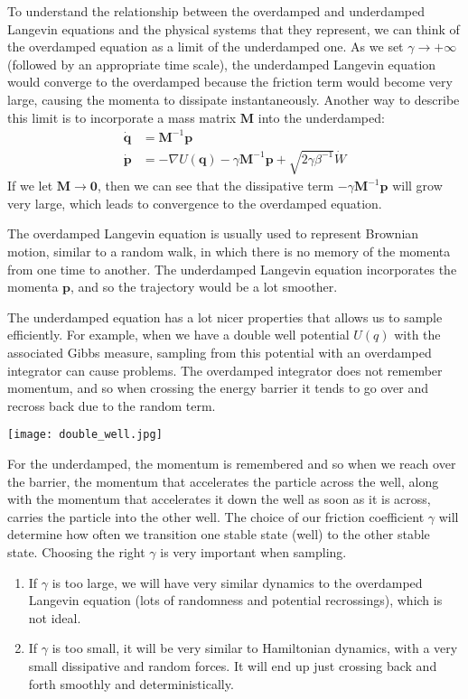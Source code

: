 \documentclass{article}
\theoremstyle{remark}
\theoremstyle{definition}
\begin{document}
To understand the relationship between the overdamped and underdamped Langevin equations and the physical systems that they represent, we can think of the overdamped equation as a limit of the underdamped one. As we set $\gamma \rightarrow +\infty$ (followed by an appropriate time scale), the underdamped Langevin equation would converge to the overdamped because the friction term would become very large, causing the momenta to dissipate instantaneously. Another way to describe this limit is to incorporate a mass matrix $\mathbf{M}$ into the underdamped: 
\begin{align*}
    \mathbf{\dot{q}} & = \mathbf{M}^{-1} \mathbf{p} \\
    \mathbf{\dot{p}} & = - \nabla U(\mathbf{q}) - \gamma \mathbf{M}^{-1} \mathbf{p} + \sqrt{2\gamma \beta^{-1}} \dot{W}
\end{align*}
If we let $\mathbf{M} \rightarrow \mathbf{0}$, then we can see that the dissipative term $- \gamma \mathbf{M}^{-1}  \mathbf{p}$ will grow very large, which leads to convergence to the overdamped equation. 

The overdamped Langevin equation is usually used to represent Brownian motion, similar to a random walk, in which there is no memory of the momenta from one time to another. The underdamped Langevin equation incorporates the momenta $\mathbf{p}$, and so the trajectory would be a lot smoother. 

The underdamped equation has a lot nicer properties that allows us to sample efficiently. For example, when we have a double well potential $U(q)$ with the associated Gibbs measure, sampling from this potential with an overdamped integrator can cause problems. The overdamped integrator does not remember momentum, and so when crossing the energy barrier it tends to go over and recross back due to the random term. 
\begin{center}
    \texttt{[image: double\_well.jpg]}
\end{center}
For the underdamped, the momentum is remembered and so when we reach over the barrier, the momentum that accelerates the particle across the well, along with the momentum that accelerates it down the well as soon as it is across, carries the particle into the other well. The choice of our friction coefficient $\gamma$ will determine how often we transition one stable state (well) to the other stable state. Choosing the right $\gamma$ is very important when sampling. 
\begin{enumerate}
    \item If $\gamma$ is too large, we will have very similar dynamics to the overdamped Langevin equation (lots of randomness and potential recrossings), which is not ideal.
    \item If $\gamma$ is too small, it will be very similar to Hamiltonian dynamics, with a very small dissipative and random forces. It will end up just crossing back and forth smoothly and deterministically. 
\end{enumerate}
\end{document}
